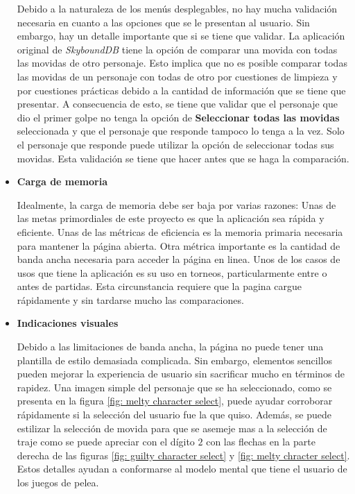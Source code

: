 \begin{itemize}
    Debido a la naturaleza de los menús desplegables, no hay mucha validación necesaria en cuanto a las opciones que se le presentan al usuario. Sin embargo, hay un detalle importante que si se tiene que validar. La aplicación original de \textit{SkyboundDB} tiene la opción de comparar una movida con todas las movidas de otro personaje. Esto implica que no es posible comparar todas las movidas de un personaje con todas de otro por cuestiones de limpieza y por cuestiones prácticas debido a la cantidad de información que se tiene que presentar. A consecuencia de esto, se tiene que validar que el personaje que dio el primer golpe no tenga la opción de \textbf{Seleccionar todas las movidas} seleccionada y que el personaje que responde tampoco lo tenga a la vez. Solo el personaje que responde puede utilizar la opción de seleccionar todas sus movidas. Esta validación se tiene que hacer antes que se haga la comparación.
    \item \textbf{Carga de memoria}
    
    Idealmente, la carga de memoria debe ser baja por varias razones: Unas de las metas primordiales de este proyecto es que la aplicación sea rápida y eficiente. Unas de las métricas de eficiencia es la memoria primaria necesaria para mantener la página abierta. Otra métrica importante es la cantidad de banda ancha necesaria para acceder la página en linea. Unos de los casos de usos que tiene la aplicación es su uso en torneos, particularmente entre o antes de partidas. Esta circunstancia requiere que la pagina cargue rápidamente y sin tardarse mucho las comparaciones.  

    \item \textbf{Indicaciones visuales}
    
    Debido a las limitaciones de banda ancha, la página no puede tener una plantilla de estilo demasiada complicada. Sin embargo, elementos sencillos pueden mejorar la experiencia de usuario sin sacrificar mucho en términos de rapidez. Una imagen simple del personaje que se ha seleccionado, como se presenta en la figura \ref{fig: melty character select}, puede ayudar corroborar rápidamente si la selección del usuario fue la que quiso. Además, se puede estilizar la selección de movida para que se asemeje mas a la selección de traje como se puede apreciar con el dígito $2$ con las flechas en la parte derecha de las figuras \ref{fig: guilty character select} y \ref{fig: melty chracter select}. Estos detalles ayudan a conformarse al modelo mental que tiene el usuario de los juegos de pelea.
\end{itemize}